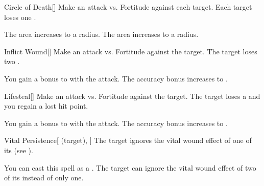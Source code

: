 \lowercase{\hypertarget{spell:Circle of Death}{}}\label{spell:Circle of Death}
\begin{freeability}[Rank 3]{\hypertarget{spell:Circle of Death}{Circle of Death}}[]
Make an attack vs. Fortitude against each target.
\hit Each target loses one .

\rankline
{} The area increases to a \arealarge radius.
 The area increases to a \areahuge radius.
\end{freeability}
\vspace{0.25em}



\lowercase{\hypertarget{spell:Inflict Wound}{}}\label{spell:Inflict Wound}
\begin{freeability}[Rank 3]{\hypertarget{spell:Inflict Wound}{Inflict Wound}}[]
Make an attack vs. Fortitude against the target.
\hit The target loses two .

\rankline
{} You gain a  bonus to  with the attack.
 The accuracy bonus increases to .
\end{freeability}
\vspace{0.25em}



\lowercase{\hypertarget{spell:Lifesteal}{}}\label{spell:Lifesteal}
\begin{freeability}[Rank 3]{\hypertarget{spell:Lifesteal}{Lifesteal}}[]
Make an attack vs. Fortitude against the target.
\hit The target loses a  and you regain a lost hit point.

\rankline
{} You gain a  bonus to  with the attack.
 The accuracy bonus increases to .
\end{freeability}
\vspace{0.25em}



\lowercase{\hypertarget{spell:Vital Persistence}{}}\label{spell:Vital Persistence}
\begin{attuneability}[Rank 3]{\hypertarget{spell:Vital Persistence}{Vital Persistence}}[ (target), ]
The target ignores the vital wound effect of one of its  (see ).

\rankline
{} You can cast this spell as a .
 The target can ignore the vital wound effect of two of its  instead of only one.
\end{attuneability}
\vspace{0.25em}



